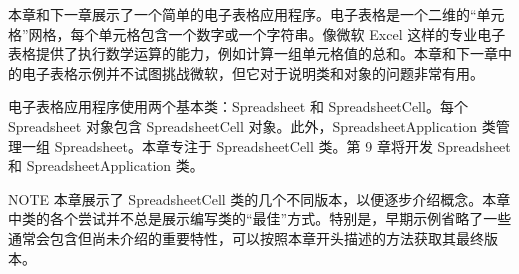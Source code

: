 本章和下一章展示了一个简单的电子表格应用程序。电子表格是一个二维的“单元格”网格，每个单元格包含一个数字或一个字符串。像微软 Excel 这样的专业电子表格提供了执行数学运算的能力，例如计算一组单元格值的总和。本章和下一章中的电子表格示例并不试图挑战微软，但它对于说明类和对象的问题非常有用。

电子表格应用程序使用两个基本类：Spreadsheet 和 SpreadsheetCell。每个 Spreadsheet 对象包含 SpreadsheetCell 对象。此外，SpreadsheetApplication 类管理一组 Spreadsheet。本章专注于 SpreadsheetCell 类。第 9 章将开发 Spreadsheet 和 SpreadsheetApplication 类。

\begin{myNotic}{NOTE}
本章展示了 SpreadsheetCell 类的几个不同版本，以便逐步介绍概念。本章中类的各个尝试并不总是展示编写类的“最佳”方式。特别是，早期示例省略了一些通常会包含但尚未介绍的重要特性，可以按照本章开头描述的方法获取其最终版本。
\end{myNotic}











